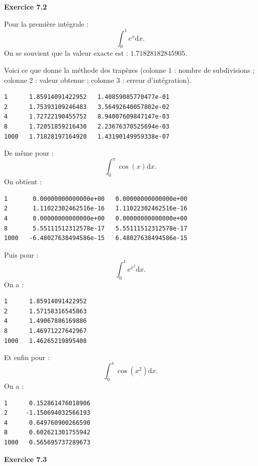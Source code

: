 \documentclass{article}
\begin{document}
{\bf Exercice 7.2}

Pour la première intégrale :
    \[
    \int_0^1 e^x \mathrm{d}x.
    \]
On se souvient que la valeur exacte  est : $1.71828182845905$.

Voici ce que donne la méthode des trapèzes (colonne 1 : nombre de subdivisions ; colonne 2 : valeur obtenue ; colonne 3 : erreur d'intégration).

\begin{verbatim}
1      1.85914091422952   1.40859085770477e-01   
2      1.75393109246483   3.56492640057802e-02
4      1.72722190455752   8.94007609847147e-03
8      1.72051859216430   2.23676370525694e-03
1000   1.71828197164920   1.43190149959338e-07
\end{verbatim}

De même pour :
    \[
    \int_0^\pi \cos(x) \mathrm{d}x.
    \]
On obtient :
\begin{verbatim}
1       0.00000000000000e+00   0.00000000000000e+00   
2       1.11022302462516e-16   1.11022302462516e-16   
4       0.00000000000000e+00   0.00000000000000e+00
8       5.55111512312578e-17   5.55111512312578e-17    
1000   -6.48027638494586e-15   6.48027638494586e-15
\end{verbatim}

Puis pour :
    \[
    \int_0^1 e^{x^2} \mathrm{d}x.
    \]
On a :
\begin{verbatim}
1      1.85914091422952   
2      1.57158316545863   
4      1.49067886169886
8      1.46971227642967   
1000   1.46265219895408
\end{verbatim}

Et enfin pour :
    \[
    \int_0^\pi \cos(x^2) \mathrm{d}x. 
    \]
On a :
\begin{verbatim}
1      0.152861476018906  
2     -1.150694032566193   
4      0.649760900266590
8      0.602621301755942   
1000   0.565695737289673
\end{verbatim}

{\bf Exercice 7.3}
\end{document}
